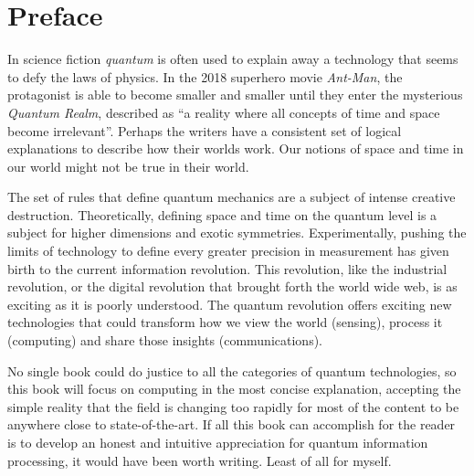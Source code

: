 \chapter*{Preface}

In science fiction \textit{quantum} is often used to explain away a technology that seems to defy the laws of physics. In the 2018 superhero movie \textit{Ant-Man}, the protagonist is able to become smaller and smaller until they enter the mysterious \textit{Quantum Realm}, described as “a reality where all concepts of time and space become irrelevant”. Perhaps the writers have a consistent set of logical explanations to describe how their worlds work. Our notions of space and time in our world might not be true in their world. 

The set of rules that define quantum mechanics are a subject of intense creative destruction. Theoretically, defining space and time on the quantum level is a subject for higher dimensions and exotic symmetries. Experimentally, pushing the limits of technology to define every greater precision in measurement has given birth to the current information revolution. This revolution, like the industrial revolution, or the digital revolution that brought forth the world wide web, is as exciting as it is poorly understood. The quantum revolution offers exciting new technologies that could transform how we view the world (sensing), process it (computing) and share those insights (communications). 

No single book could do justice to all the categories of quantum technologies, so this book will focus on computing in the most concise explanation, accepting the simple reality that the field is changing too rapidly for most of the content to be anywhere close to state-of-the-art. If all this book can accomplish for the reader is to develop an honest and intuitive appreciation for quantum information processing, it would have been worth writing. Least of all for myself. 
